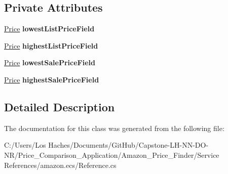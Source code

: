 \subsection*{Private Attributes}
\begin{DoxyCompactItemize}
\item 
\hypertarget{class_price___comparison_1_1amazon_1_1ecs_1_1_collections_collection_collection_summary_a1e726bb936d4db3a9e41832938b77da8}{\hyperlink{class_price___comparison_1_1amazon_1_1ecs_1_1_price}{Price} {\bfseries lowest\-List\-Price\-Field}}\label{class_price___comparison_1_1amazon_1_1ecs_1_1_collections_collection_collection_summary_a1e726bb936d4db3a9e41832938b77da8}

\item 
\hypertarget{class_price___comparison_1_1amazon_1_1ecs_1_1_collections_collection_collection_summary_a4f24fbfd57b79d958b38b3bd509dd692}{\hyperlink{class_price___comparison_1_1amazon_1_1ecs_1_1_price}{Price} {\bfseries highest\-List\-Price\-Field}}\label{class_price___comparison_1_1amazon_1_1ecs_1_1_collections_collection_collection_summary_a4f24fbfd57b79d958b38b3bd509dd692}

\item 
\hypertarget{class_price___comparison_1_1amazon_1_1ecs_1_1_collections_collection_collection_summary_a9cf2d0becaac039aa7be3b57767016e5}{\hyperlink{class_price___comparison_1_1amazon_1_1ecs_1_1_price}{Price} {\bfseries lowest\-Sale\-Price\-Field}}\label{class_price___comparison_1_1amazon_1_1ecs_1_1_collections_collection_collection_summary_a9cf2d0becaac039aa7be3b57767016e5}

\item 
\hypertarget{class_price___comparison_1_1amazon_1_1ecs_1_1_collections_collection_collection_summary_a8bbb065d31e478d97f40f5afa35fbf82}{\hyperlink{class_price___comparison_1_1amazon_1_1ecs_1_1_price}{Price} {\bfseries highest\-Sale\-Price\-Field}}\label{class_price___comparison_1_1amazon_1_1ecs_1_1_collections_collection_collection_summary_a8bbb065d31e478d97f40f5afa35fbf82}

\end{DoxyCompactItemize}


\subsection{Detailed Description}


The documentation for this class was generated from the following file\-:\begin{DoxyCompactItemize}
\item 
C\-:/\-Users/\-Los Haches/\-Documents/\-Git\-Hub/\-Capstone-\/\-L\-H-\/\-N\-N-\/\-D\-O-\/\-N\-R/\-Price\-\_\-\-Comparison\-\_\-\-Application/\-Amazon\-\_\-\-Price\-\_\-\-Finder/\-Service References/amazon.\-ecs/Reference.\-cs\end{DoxyCompactItemize}
